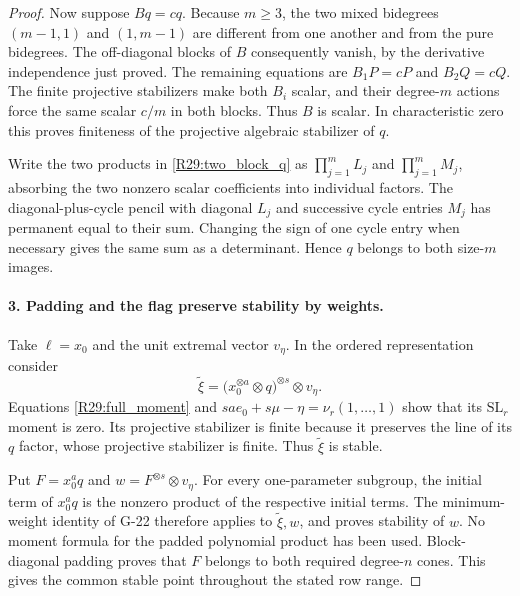 \begin{proof}
Now suppose $Bq=cq$. Because $m\geq3$, the two mixed
bidegrees $(m-1,1)$ and $(1,m-1)$ are different from
one another and from the pure bidegrees. The off-diagonal
blocks of $B$ consequently vanish, by the derivative
independence just proved. The remaining equations are
$B_1P=cP$ and $B_2Q=cQ$. The finite projective stabilizers
make both $B_i$ scalar, and their degree-$m$ actions force
the same scalar $c/m$ in both blocks. Thus $B$ is scalar.
In characteristic zero this proves finiteness of the
projective algebraic stabilizer of $q$.

Write the two products in \eqref{R29:two_block_q} as
$\prod_{j=1}^m L_j$ and $\prod_{j=1}^m M_j$, absorbing
the two nonzero scalar coefficients into individual factors.
The diagonal-plus-cycle pencil with diagonal $L_j$ and
successive cycle entries $M_j$ has permanent equal to
their sum. Changing the sign of one cycle entry when
necessary gives the same sum as a determinant. Hence
$q$ belongs to both size-$m$ images.

\paragraph{3. Padding and the flag preserve stability by weights.}
Take $\ell=x_0$ and the unit extremal vector $v_\eta$.
In the ordered representation consider
\[
 \widetilde\xi=
  \bigl(x_0^{\otimes a}\otimes q\bigr)^{\otimes s}
                    \otimes v_\eta.
\]
Equations \eqref{R29:full_moment} and
$sa e_0+s\mu-\eta=\nu_r(1,\ldots,1)$ show that its
$\mathrm{SL}_r$ moment is zero. Its projective stabilizer
is finite because it preserves the line of its $q$ factor,
whose projective stabilizer is finite. Thus
$\widetilde\xi$ is stable.

Put $F=x_0^a q$ and $w=F^{\otimes s}\otimes v_\eta$.
For every one-parameter subgroup, the initial term of
$x_0^a q$ is the nonzero product of the respective initial
terms. The minimum-weight identity of G-22 therefore
applies to $\widetilde\xi,w$, and proves stability of $w$.
No moment formula for the padded polynomial product has
been used. Block-diagonal padding proves that $F$ belongs
to both required degree-$n$ cones. This gives the common
stable point throughout the stated row range.


\end{proof}

